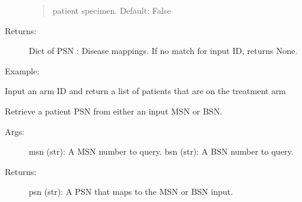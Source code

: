 \documentclass[letterpaper,10pt,english]{sphinxmanual}
\begin{document}
\begin{fulllineitems}
\begin{fulllineitems}
\begin{description}
\begin{quote}
patient specimen. Default: False
\end{quote}

\item[{Returns:}] \leavevmode
Dict of PSN : Disease mappings. If no match for input ID, returns None.

\item[{Example:}] \leavevmode
\begin{sphinxVerbatim}[commandchars=\\\{\}]
\end{sphinxVerbatim}

\end{description}

\end{fulllineitems}


\begin{fulllineitems}
\label{\detokenize{matchbox_api_utils:matchbox_api_utils.MatchData.get_patients_by_arm}}
Input an arm ID and return a list of patients that are on the treatment arm

\end{fulllineitems}


\begin{fulllineitems}
\label{\detokenize{matchbox_api_utils:matchbox_api_utils.MatchData.get_psn}}
Retrieve a patient PSN from either an input MSN or BSN.
\begin{description}
\item[{Args:}] \leavevmode
msn (str): A MSN number to query.
bsn (str): A BSN number to query.

\item[{Returns:}] \leavevmode
psn (str): A PSN that maps to the MSN or BSN input.

\end{description}

\begin{sphinxVerbatim}[commandchars=\\\{\}]
\end{sphinxVerbatim}


\end{fulllineitems}
\end{fulllineitems}
\end{document}
